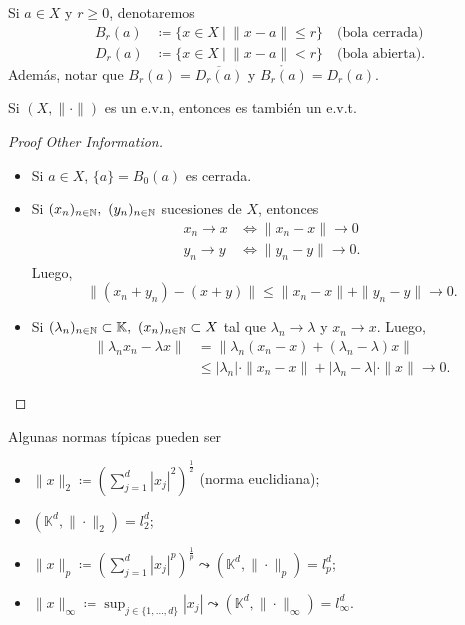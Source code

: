 \begin{notation}
	Si $a \in X$ y $r \geq 0$, denotaremos
	\begin{align*}
		B_{r}(a) &\coloneq \{x \in X \ | \ \| x - a \| \leq r\} \quad \text{(bola cerrada)} \\
		D_{r}(a) &\coloneq \{x \in X \ | \ \| x - a \| < r\} \quad \text{(bola abierta)}
	.\end{align*}
	Además, notar que $B_{r}(a) = \overline{D_{r}(a)}$ y $\mathring{B_{r}(a)} = D_{r}(a).$
\end{notation}

\begin{prop}
	Si $(X, \| \cdot \|)$ es un e.v.n, entonces es también un e.v.t.
\end{prop}
\begin{proof}[Proof Other Information]
	\begin{itemize}
		\item Si $a \in X$, $\{a\} = B_{0}(a)$ es cerrada. 

		\item Si $(x_{n})_{n \in \mathbb{N}},\ (y_{n})_{n \in \mathbb{N}}$ sucesiones de $X$, entonces
		\begin{align*}
			x_{n} \longrightarrow x &\iff \| x_{n} - x \| \longrightarrow 0 \\
			y_{n} \longrightarrow y &\iff \| y_{n} - y \| \longrightarrow 0
		.\end{align*}
		Luego,
		\[ \| (x_{n} + y_{n}) - (x + y) \| \leq \| x_{n} - x \| + \| y_{n} - y \| \longrightarrow 0. \]

		\item Si $(\lambda_{n})_{n \in \mathbb{N}} \subset \mathbb{K},\ (x_{n})_{n \in \mathbb{N}} \subset X$ tal que $\lambda_{n} \longrightarrow \lambda$ y $x_{n} \longrightarrow x$. Luego,
		\begin{align*}
			\| \lambda_{n} x_{n} - \lambda x \| &= \| \lambda_{n} (x_{n} - x) + (\lambda_{n} - \lambda) x \| \\
			&\leq |\lambda_{n}| \cdot \| x_{n} - x \| + |\lambda_{n} - \lambda| \cdot \| x \| \longrightarrow 0
		.\end{align*}
	\end{itemize}
\end{proof}

\begin{eg}
	Algunas normas típicas pueden ser
	\begin{itemize}
		\item $\| x \|_{2} \coloneq \left( \sum_{j=1}^{d} |x_{j}|^{2} \right)^{\frac{1}{2}}$ (norma euclidiana);

		\item $(\mathbb{K}^{d}, \| \cdot \|_{2}) = l_{2}^{d}$;

		\item $\| x \|_{p} \coloneq \left( \sum_{j=1}^{d} |x_{j}|^{p} \right)^{\frac{1}{p}} \leadsto (\mathbb{K}^{d}, \| \cdot \|_{p}) = l_{p}^{d}$;

		\item $\| x \|_{\infty} \coloneq \sup_{j \in \{1,\dots,d\}} |x_{j}| \leadsto (\mathbb{K}^{d}, \| \cdot \|_{\infty}) = l_{\infty}^{d}$.
	\end{itemize}
\end{eg}


